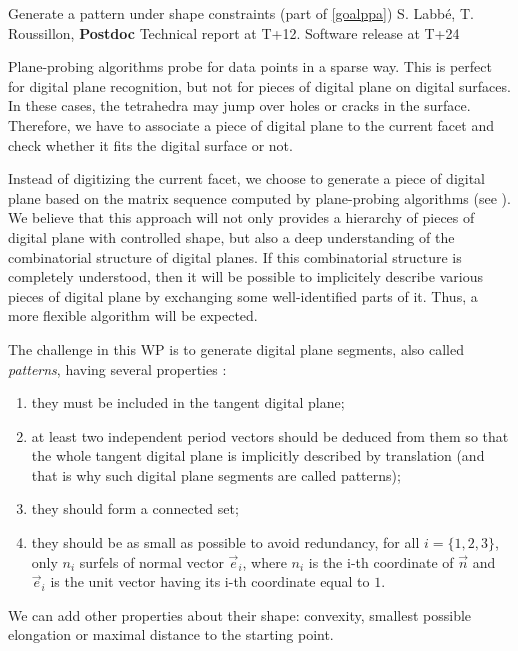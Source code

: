 
\medskip
{}
   {Generate a pattern under shape constraints (part of \ref{goalppa})}
   {S. Labb\'{e}, T. Roussillon, \textbf{Postdoc}}
   {Technical report at T+12. Software release at T+24}
\medskip

Plane-probing algorithms probe for data points in a sparse way.
This is perfect for digital plane recognition, but not for pieces
of digital plane on digital surfaces. In these cases, the tetrahedra
may jump over holes or cracks in the surface. Therefore, we have to
associate a piece of digital plane to the current facet and check
whether it fits the digital surface or not.

Instead of digitizing the current facet, we choose to generate a piece
of digital plane based on the matrix sequence computed by
plane-probing algorithms (see ). We believe that
this approach will not only provides a hierarchy of pieces of digital
plane with controlled shape, but also a deep understanding of the
combinatorial structure of digital planes. If this combinatorial
structure is completely understood, then it will be possible to implicitely
describe various pieces of digital plane by exchanging some well-identified
parts of it. Thus, a more flexible algorithm will be expected.  

The challenge in this WP is to generate digital plane segments, also called
\emph{patterns}, having several properties \cite{Jamet2016}:
\begin{enumerate}[label=(P\arabic*)]
\item they must be included in the tangent digital plane; \label{prop:inside}
\item at least two independent period vectors should be deduced from them
  so that the whole tangent digital plane is implicitly described by translation
  (and that is why such digital plane segments are called patterns); \label{prop:period}
\item they should form a connected set; \label{prop:connect}
\item they should be as small as possible to avoid redundancy,
  \eg for all $i=\{1,2,3\}$, only $n_i$ surfels of normal vector $\vec{e}_i$,
  where $n_i$ is the i-th coordinate of $\vec{n}$ and $\vec{e}_i$ is the unit
  vector having its i-th coordinate equal to $1$. \label{prop:small}
\end{enumerate}
We can add other properties about their shape: 
convexity, smallest possible elongation or maximal distance to the starting point.


